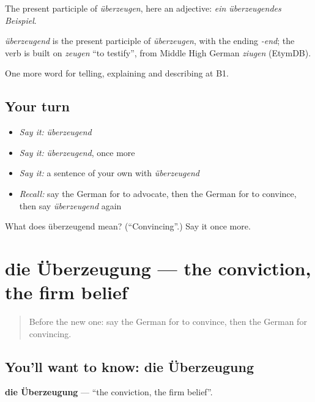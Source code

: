 The present participle of \emph{überzeugen}, here an adjective: \emph{ein überzeugendes Beispiel}.

\begin{cousinweb}
\emph{überzeugend} is the present participle of \emph{überzeugen}, with the ending \emph{-end}; the verb is built on \emph{zeugen} \textquotedblleft{}to testify\textquotedblright{}, from Middle High German \emph{ziugen} (EtymDB).
\end{cousinweb}

\begin{grammarlens}[title={What you've built}]
One more word for telling, explaining and describing at B1.
\end{grammarlens}

\subsection*{Your turn}
\begin{itemize}
\raggedright
  \item \emph{Say it:} \emph{überzeugend}
  \item \emph{Say it:} \emph{überzeugend}, once more
  \item \emph{Say it:} a sentence of your own with \emph{überzeugend}
  \item \emph{Recall:} say the German for to advocate, then the German for to convince, then say \emph{überzeugend} again
\end{itemize}

\begin{tcolorbox}[breakable,colback=teal!4,colframe=teal!35!black,title={Before you move on}]
What does überzeugend mean? (\textquotedblleft{}Convincing\textquotedblright{}.) Say it once more.
\end{tcolorbox}
\section[die Überzeugung]{die Überzeugung — the conviction, the firm belief}

\label{lesson:GE-C331-ueberzeugung}



\begin{quote}
Before the new one: say the German for to convince, then the German for convincing.
\end{quote}

\subsection*{You'll want to know: die Überzeugung}
\textbf{die Überzeugung} — \textquotedblleft{}the conviction, the firm belief\textquotedblright{}.

